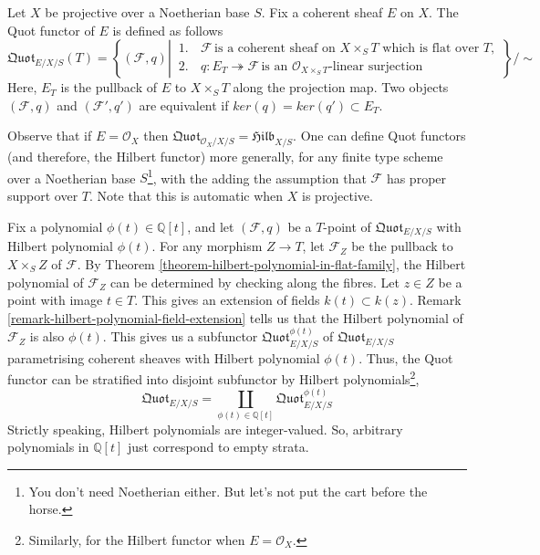 \documentclass[ignorenonframetext,t]{beamer}
\newcommand{\sF}{{\mathcal F}}
\newcommand{\sO}{{\mathcal O}}
\newcommand{\Q}{{\mathbb Q}}
\theoremstyle{definition}
\begin{document}
\begin{definition}
	Let $X$ be projective over a Noetherian base $S$. Fix a coherent sheaf $E$ on $X$. The Quot functor of $E$ is defined as follows
	\begin{equation*}
	\mathfrak{Quot}_{E/X/S}(T)=\left\{(\sF,q) \left|\,
	\begin{aligned}
	1.\, &\sF\, \text{is a coherent sheaf on $X\times_S T$ which is flat over $T$}, \\
	2.\, &q: E_T \twoheadrightarrow \sF\, \text{is an $\sO_{X\times_S T}$-linear surjection}
	\end{aligned}
	\right.\right\}\Bigg/\!\sim
	\end{equation*}
	Here, $E_T$ is the pullback of $E$ to $X\times_S T$ along the projection map. Two objects $(\sF,q)$ and $(\sF',q')$ are equivalent if $ker(q)=ker(q')\subset E_T$.
\end{definition}


Observe that if $E=\sO_X$ then $\mathfrak{Quot}_{\sO_X/X/S}=\mathfrak{Hilb}_{X/S}$. One can define Quot functors (and therefore, the Hilbert functor) more generally, for any finite type scheme over a Noetherian base $S$\footnote{You don't need Noetherian either. But let's not put the cart before the horse.}, with the adding the assumption that $\sF$ has proper support over $T$. Note that this is automatic when $X$ is projective.

Fix a polynomial $\phi(t)\in \Q[t]$, and let $(\sF,q)$ be a $T$-point of $\mathfrak{Quot}_{E/X/S}$ with Hilbert polynomial $\phi(t)$. For any morphism $Z\rightarrow T$, let $\sF_Z$ be the pullback to $X\times_S Z$ of $\sF$. By Theorem \ref{theorem-hilbert-polynomial-in-flat-family}, the Hilbert polynomial of $\sF_Z$ can be determined by checking along the fibres. Let $z\in Z$ be a point with image $t\in T$. This gives an extension of fields $k(t)\subset k(z)$. Remark \ref{remark-hilbert-polynomial-field-extension} tells us that the Hilbert polynomial of $\sF_Z$ is also $\phi(t)$. This gives us a subfunctor $\mathfrak{Quot}^{\phi(t)}_{E/X/S}$ of $\mathfrak{Quot}_{E/X/S}$ parametrising coherent sheaves with Hilbert polynomial $\phi(t)$. Thus, the Quot functor can be stratified into disjoint subfunctor by Hilbert polynomials\footnote{Similarly, for the Hilbert functor when $E=\sO_X$.},
\[\mathfrak{Quot}_{E/X/S}=\underset{\phi(t)\in \Q[t]}{\coprod} \mathfrak{Quot}^{\phi(t)}_{E/X/S}\]
Strictly speaking, Hilbert polynomials are integer-valued. So, arbitrary polynomials in $\Q[t]$ just correspond to empty strata.
\end{document}
